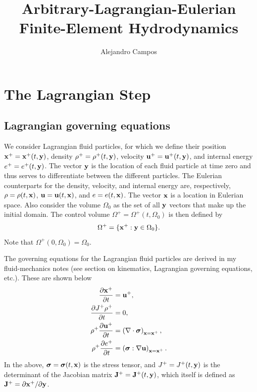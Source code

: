\documentclass[11pt]{report}
\title{Arbitrary-Lagrangian-Eulerian Finite-Element Hydrodynamics}
\author{Alejandro Campos}
\begin{document}
\maketitle
\tableofcontents

\chapter{The Lagrangian Step}
\section{Lagrangian governing equations}
We consider Lagrangian fluid particles, for which we define their position $\mathbf{x}^+=\mathbf{x}^+(t,\mathbf{y})$, density $\rho^+ = \rho^+(t,\mathbf{y})$, velocity $\mathbf{u}^+ = \mathbf{u}^+(t,\mathbf{y})$, and internal energy $e^+ = e^+(t,\mathbf{y})$. The vector $\mathbf{y}$ is the location of each fluid particle at time zero and thus serves to differentiate between the different particles. The Eulerian counterparts for the density, velocity, and internal energy are, respectively, $\rho = \rho(t,\mathbf{x})$, $\mathbf{u} = \mathbf{u}(t,\mathbf{x})$, and $e = e(t,\mathbf{x})$. The vector $\mathbf{x}$ is a location in Eulerian space. Also consider the volume $\Omega_0$ as the set of all $\mathbf{y}$ vectors that make up the initial domain. The control volume $\Omega^+ = \Omega^+(t, \Omega_0)$ is then defined by
\begin{equation}
    \Omega^+ = \{ \mathbf{x}^+:\mathbf{y} \in \Omega_0 \}.
\end{equation}
Note that $\Omega^+(0,\Omega_0) = \Omega_0$.

The governing equations for the Lagrangian fluid particles are derived in my fluid-mechanics notes (see section on kinematics, Lagrangian governing equations, etc.). These are shown below
\begin{align}
    \frac{\partial \mathbf{x}^+}{\partial t} &= \mathbf{u}^+, \label{eq:lag_gov_evol_x} \\
    \frac{\partial J^+ \rho^+}{\partial t} &= 0, \label{eq:lag_gov_evol_rho} \\
    \rho^+ \frac{\partial \mathbf{u}^+}{\partial t} &= \left ( \nabla \cdot \bm \sigma \right )_{\mathbf{x} = \mathbf{x}^+}, \label{eq:lag_gov_evol_u} \\
    \rho^+ \frac{\partial e^+}{\partial t} &= \left ( \bm \sigma : \nabla \mathbf{u} \right )_{\mathbf{x} = \mathbf{x}^+}. \label{eq:lag_gov_evol_e}
\end{align}
In the above, $\bm \sigma = \bm \sigma(t,\mathbf{x})$ is the stress tensor, and $J^+ = J^+(t,\mathbf{y})$ is the determinant of the Jacobian matrix $\mathbf{J}^+ = \mathbf{J}^+(t,\mathbf{y})$, which itself is defined as $\mathbf{J}^+ =  \partial \mathbf{x}^+ / \partial \mathbf{y}$. 
\end{document}
